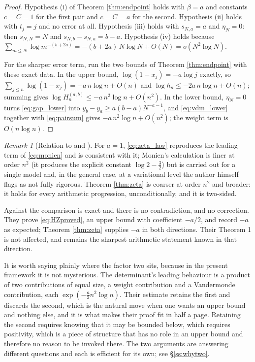 \documentclass[11pt]{amsart}
\numberwithin{equation}{section}
\theoremstyle{plain}
\theoremstyle{definition}
\theoremstyle{remark}
\newtheorem{remark}[theorem]{Remark}
\begin{document}
\begin{proof}
Hypothesis (i) of Theorem \ref{thm:endpoint} holds with $\beta=a$ and constants $c=C=1$ for the
first pair and $c=C=a$ for the second. Hypothesis (ii) holds with $t_{j}=j$ and no error at all.
Hypothesis (iii) holds with $s_{N,a}=a$ and $\eta_{N}=0$: then $s_{N,N}=N$ and
$s_{N,b}-s_{N,a}=b-a$. Hypothesis (iv) holds because
$\sum_{m\le N}\log m^{-(b+2a)}=-(b+2a)\,N\log N+O(N)=o(N^{2}\log N)$.

For the sharper error term, run the two bounds of Theorem \ref{thm:endpoint} with these exact data.
In the upper bound, $\log(1-x_{j})=-a\log j$ exactly, so
$\sum_{j\le n}\log(1-x_{j})=-a\,n\log n+O(n)$ and $\log h_{n}\le-2a\,n\log n+O(n)$; summing gives
$\log H_{n}^{(a,b)}\le-a\,n^{2}\log n+O(n^{2})$. In the lower bound, $\eta_{N}=0$ turns
\eqref{eq:gap_lower} into $y_{b}-y_{a}\ge a(b-a)N^{-a-1}$, and \eqref{eq:vdm_lower} together with
\eqref{eq:pairsum} gives $-a\,n^{2}\log n+O(n^{2})$; the weight term is $O(n\log n)$.
\end{proof}

\begin{remark}[Relation to \cite{Monien2009} and \cite{HaynesZudilin2015}]
\label{rem:position}
For $a=1$, \eqref{eq:zeta_law} reproduces the leading term of \eqref{eq:monien} and is consistent
with it; Monien's calculation is finer at order $n^{2}$ (it produces the explicit constant
$\log 2-\tfrac32$) but is carried out for a single model and, in the general case, at a variational
level the author himself flags as not fully rigorous. Theorem \ref{thm:zeta} is coarser at order
$n^{2}$ and broader: it holds for every arithmetic progression, unconditionally, and it is two-sided.

Against \cite{HaynesZudilin2015} the comparison is exact and there is no contradiction, and no
correction. They prove \eqref{eq:HZproved}, an upper bound with coefficient $-a/2$, and record $-a$
as expected; Theorem \ref{thm:zeta} supplies $-a$ in both directions. Their Theorem 1 is not
affected, and remains the sharpest arithmetic statement known in that direction.

It is worth saying plainly where the factor two sits, because in the present framework it is not
mysterious. The determinant's leading behaviour is a product of two contributions of equal size, a
weight contribution and a Vandermonde contribution, each $\exp(-\tfrac a2n^{2}\log n)$. Their
estimate retains the first and discards the second, which is the natural move when one wants an
upper bound and nothing else, and it is what makes their proof fit in half a page. Retaining the
second requires knowing that it may be bounded below, which requires positivity, which is a piece of
structure that has no role in an upper bound and therefore no reason to be invoked there. The two
arguments are answering different questions and each is efficient for its own; see
\S\ref{ss:whytwo}.
\end{remark}
\end{document}

